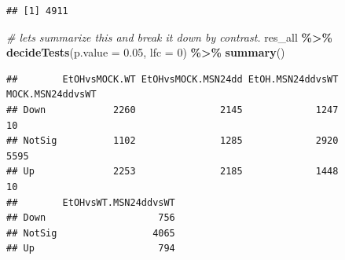 \documentclass[
]{book}
\newenvironment{Shaded}{\begin{snugshade}}{\end{snugshade}}
\newcommand{\AttributeTok}[1]{\textcolor[rgb]{0.13,0.29,0.53}{#1}}
\newcommand{\CommentTok}[1]{\textcolor[rgb]{0.56,0.35,0.01}{\textit{#1}}}
\newcommand{\DecValTok}[1]{\textcolor[rgb]{0.00,0.00,0.81}{#1}}
\newcommand{\FloatTok}[1]{\textcolor[rgb]{0.00,0.00,0.81}{#1}}
\newcommand{\FunctionTok}[1]{\textcolor[rgb]{0.13,0.29,0.53}{\textbf{#1}}}
\newcommand{\NormalTok}[1]{#1}
\newcommand{\SpecialCharTok}[1]{\textcolor[rgb]{0.81,0.36,0.00}{\textbf{#1}}}
\begin{document}
\begin{Shaded}
\end{Shaded}

\begin{verbatim}
## [1] 4911
\end{verbatim}

\begin{Shaded}
\begin{Highlighting}[]
\CommentTok{\# let\textquotesingle{}s summarize this and break it down by contrast.}
\NormalTok{res\_all }\SpecialCharTok{\%\textgreater{}\%}
  \FunctionTok{decideTests}\NormalTok{(}\AttributeTok{p.value =} \FloatTok{0.05}\NormalTok{, }\AttributeTok{lfc =} \DecValTok{0}\NormalTok{) }\SpecialCharTok{\%\textgreater{}\%}
  \FunctionTok{summary}\NormalTok{()}
\end{Highlighting}
\end{Shaded}

\begin{verbatim}
##        EtOHvsMOCK.WT EtOHvsMOCK.MSN24dd EtOH.MSN24ddvsWT MOCK.MSN24ddvsWT
## Down            2260               2145             1247               10
## NotSig          1102               1285             2920             5595
## Up              2253               2185             1448               10
##        EtOHvsWT.MSN24ddvsWT
## Down                    756
## NotSig                 4065
## Up                      794
\end{verbatim}
\end{document}
